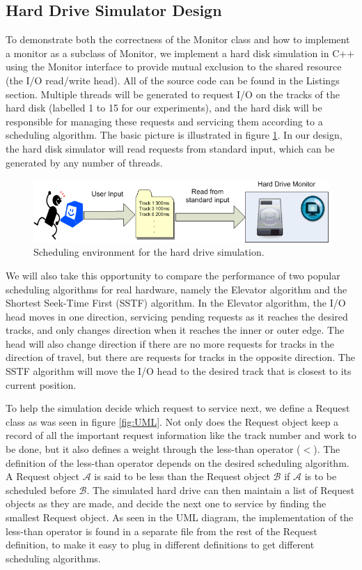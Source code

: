 \documentclass[12pt]{report}
\begin{document}
\subsection{Hard Drive Simulator Design}
To demonstrate both the correctness of the Monitor class and how to implement a monitor as
a subclass of Monitor, we implement a hard disk simulation in C++ using the Monitor
interface to provide mutual exclusion to the shared resource (the I/O read/write head).
All of the source code can be found in the Listings section.
Multiple threads will be generated to request I/O on the tracks of the hard disk (labelled
1 to 15 for our experiments), and the hard disk will be responsible for managing these
requests and servicing them according to a scheduling algorithm. The basic picture is
illustrated in figure \ref{fig:sched}. In our design, the hard disk simulator will read
requests from standard input, which can be generated by any number of threads.
\begin{figure}[htb!]
    \centering
    \includegraphics[scale=0.6]{Scheduling_Env.png}
    \caption{Scheduling environment for the hard drive simulation.}
    \label{fig:sched}
\end{figure}

We will also take this opportunity to compare the performance of two popular scheduling
algorithms for real hardware, namely the Elevator algorithm and the Shortest Seek-Time
First (SSTF) algorithm. In the Elevator algorithm, the I/O head moves in one direction,
servicing pending requests as it reaches the desired tracks, and only changes direction
when it reaches the inner or outer edge. The head will also change direction if there are 
no more requests for tracks in the direction of travel, but there are requests for tracks
in the opposite direction. The SSTF algorithm will move the I/O head to the desired
track that is closest to its current position.

To help the simulation decide which request to service next, we define a Request class as
was seen in figure \ref{fig:UML}. Not only does the Request object keep a record of all
the important request information like the track number and work to be done, but it also
defines a weight through the less-than operator ($<$). The definition of the less-than
operator depends on the desired scheduling algorithm. A Request object $\mathcal{A}$ is said to be
less than the Request object $\mathcal{B}$ if $\mathcal{A}$ is to be scheduled before
$\mathcal{B}$. The simulated hard drive can then maintain a list of
Request objects as they are made, and decide the next one to service by finding the
smallest Request object. As seen in the UML diagram, the implementation of the less-than
operator is found in a separate file from the rest of the Request definition, to make it
easy to plug in different definitions to get different scheduling algorithms.
\end{document}
